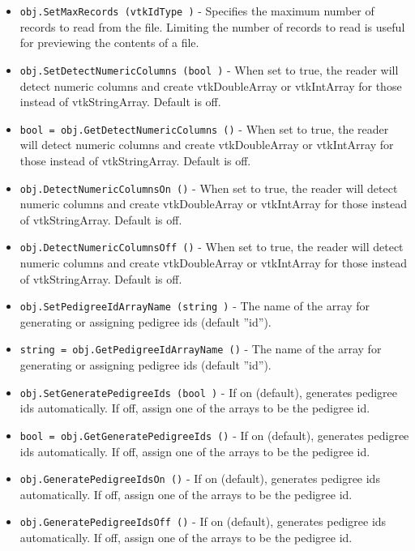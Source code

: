 \begin{itemize}
\item  \verb|obj.SetMaxRecords (vtkIdType )| -  Specifies the maximum number of records to read from the file.  Limiting the
 number of records to read is useful for previewing the contents of a file.

\item  \verb|obj.SetDetectNumericColumns (bool )| -  When set to true, the reader will detect numeric columns and create
 vtkDoubleArray or vtkIntArray for those instead of vtkStringArray. Default
 is off.

\item  \verb|bool = obj.GetDetectNumericColumns ()| -  When set to true, the reader will detect numeric columns and create
 vtkDoubleArray or vtkIntArray for those instead of vtkStringArray. Default
 is off.

\item  \verb|obj.DetectNumericColumnsOn ()| -  When set to true, the reader will detect numeric columns and create
 vtkDoubleArray or vtkIntArray for those instead of vtkStringArray. Default
 is off.

\item  \verb|obj.DetectNumericColumnsOff ()| -  When set to true, the reader will detect numeric columns and create
 vtkDoubleArray or vtkIntArray for those instead of vtkStringArray. Default
 is off.

\item  \verb|obj.SetPedigreeIdArrayName (string )| -  The name of the array for generating or assigning pedigree ids
 (default ''id'').

\item  \verb|string = obj.GetPedigreeIdArrayName ()| -  The name of the array for generating or assigning pedigree ids
 (default ''id'').

\item  \verb|obj.SetGeneratePedigreeIds (bool )| -  If on (default), generates pedigree ids automatically.
 If off, assign one of the arrays to be the pedigree id.

\item  \verb|bool = obj.GetGeneratePedigreeIds ()| -  If on (default), generates pedigree ids automatically.
 If off, assign one of the arrays to be the pedigree id.

\item  \verb|obj.GeneratePedigreeIdsOn ()| -  If on (default), generates pedigree ids automatically.
 If off, assign one of the arrays to be the pedigree id.

\item  \verb|obj.GeneratePedigreeIdsOff ()| -  If on (default), generates pedigree ids automatically.
 If off, assign one of the arrays to be the pedigree id.


\end{itemize}

